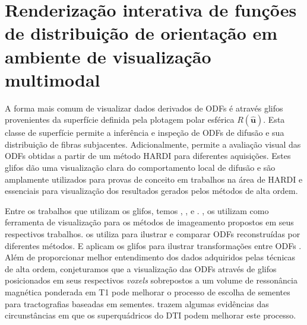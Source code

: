 \chapter{Renderização interativa de funções de distribuição de orientação em ambiente de visualização multimodal}
\label{chap::renderizacao_interativa_de_perfis_de_difusao}



A forma mais comum de visualizar dados derivados de ODFs é através glifos provenientes da superfície definida pela plotagem polar esférica $R(\mathbf{\hat{u}})$. Esta classe de superfície permite a inferência e inspeção de ODFs de difusão e sua distribuição de fibras subjacentes. Adicionalmente, permite a avaliação visual das ODFs obtidas a partir de um método HARDI para diferentes aquisições. Estes glifos dão uma visualização clara do comportamento local de difusão e são amplamente utilizados para provas de conceito em trabalhos na área de HARDI e essenciais para visualização dos resultados gerados pelos métodos de alta ordem.

Entre os trabalhos que utilizam os glifos, temos ,  ,    e  . ,   os utilizam como ferramenta de visualização para os métodos de imageamento propostos em seus respectivos trabalhos.  os utiliza para ilustrar e comparar ODFs reconstruídas por diferentes métodos. E  aplicam os glifos  para ilustrar transformações entre ODFs . 
Além de proporcionar melhor entendimento dos dados adquiridos pelas técnicas de alta ordem, conjeturamos que a visualização das ODFs através de glifos posicionados em seus respectivos \textit{voxels} sobrepostos a um volume de ressonância magnética ponderada em T1 pode melhorar o processo de escolha de sementes para tractografias baseadas em sementes.  trazem algumas evidências das circunstâncias em que os superquádricos do DTI podem melhorar este processo.

